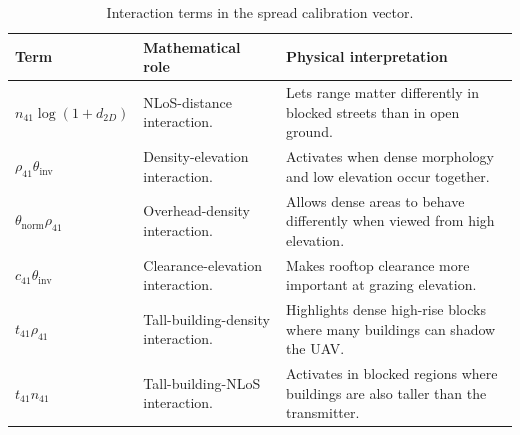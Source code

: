 \begin{table}[H]
\centering
\small
\begin{tabularx}{\textwidth}{p{3.2cm} X X}
\toprule
\textbf{Term} & \textbf{Mathematical role} & \textbf{Physical interpretation} \\
\midrule
\(n_{41}\log(1+d_{2D})\) & NLoS-distance interaction. & Lets range matter differently in blocked streets than in open ground. \\
\(\rho_{41}\theta_{\mathrm{inv}}\) & Density-elevation interaction. & Activates when dense morphology and low elevation occur together. \\
\(\theta_{\mathrm{norm}}\rho_{41}\) & Overhead-density interaction. & Allows dense areas to behave differently when viewed from high elevation. \\
\(c_{41}\theta_{\mathrm{inv}}\) & Clearance-elevation interaction. & Makes rooftop clearance more important at grazing elevation. \\
\(t_{41}\rho_{41}\) & Tall-building-density interaction. & Highlights dense high-rise blocks where many buildings can shadow the UAV. \\
\(t_{41}n_{41}\) & Tall-building-NLoS interaction. & Activates in blocked regions where buildings are also taller than the transmitter. \\
\bottomrule
\end{tabularx}
\caption{Interaction terms in the spread calibration vector.}
\label{tab:x79_interaction_inventory}
\end{table}

